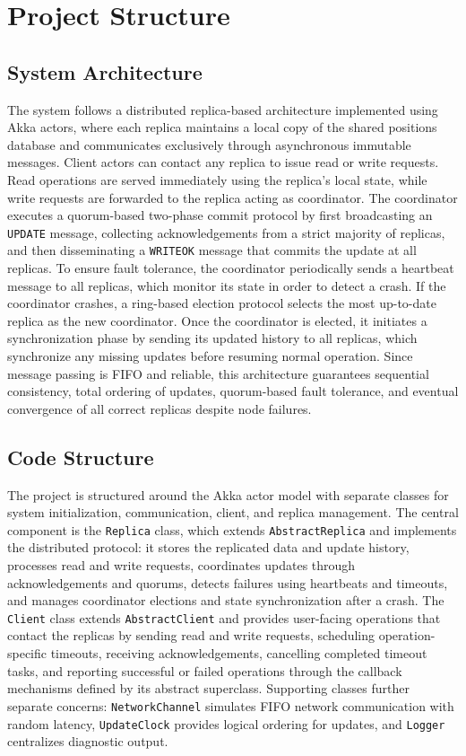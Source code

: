 \section{Project Structure}

\subsection{System Architecture}
The system follows a distributed replica-based architecture implemented using
Akka actors, where each replica maintains a local copy of the shared positions
database and communicates exclusively through asynchronous immutable messages.
Client actors can contact any replica to issue read or write requests.
Read operations are served immediately using the replica's local state,
while write requests are forwarded to the replica acting as coordinator.
The coordinator executes a quorum-based two-phase commit protocol
by first broadcasting an \texttt{UPDATE} message, collecting acknowledgements from a
strict majority of replicas, and then disseminating a \texttt{WRITEOK} message that
commits the update at all replicas.
To ensure fault tolerance, the coordinator periodically sends a heartbeat message to
all replicas, which monitor its state in order to detect a crash.
If the coordinator crashes, a ring-based election protocol selects
the most up-to-date replica as the new coordinator.
Once the coordinator is elected, it initiates a synchronization phase by
sending its updated history to all replicas, which synchronize any missing
updates before resuming normal operation.
Since message passing is FIFO and reliable, this architecture guarantees
sequential consistency, total ordering of updates, quorum-based fault tolerance,
and eventual convergence of all correct replicas despite node failures.

\subsection{Code Structure}
The project is structured around the Akka actor model with separate classes for
system initialization, communication, client, and replica management.
The central component is the \texttt{Replica} class, which extends \texttt{AbstractReplica}
and implements the distributed protocol: it stores the replicated data and update history,
processes read and write requests, coordinates updates through acknowledgements and
quorums, detects failures using heartbeats and timeouts, and manages coordinator elections
and state synchronization after a crash.
The \texttt{Client} class extends \texttt{AbstractClient} and provides user-facing
operations that contact the replicas by sending read and write requests, scheduling
operation-specific timeouts, receiving acknowledgements, cancelling completed timeout tasks,
and reporting successful or failed operations through the callback mechanisms defined by
its abstract superclass.
Supporting classes further separate concerns: \texttt{NetworkChannel} simulates FIFO
network communication with random latency, \texttt{UpdateClock} provides logical
ordering for updates, and \texttt{Logger} centralizes diagnostic output.

